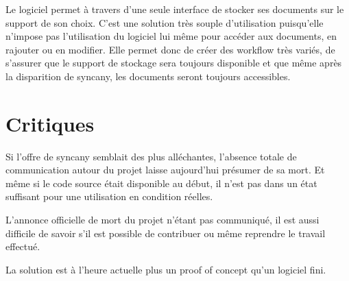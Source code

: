 Le logiciel permet à travers d'une seule interface de stocker ses documents sur le support de son choix. C'est une solution très souple d'utilisation puisqu'elle n'impose pas l'utilisation du logiciel lui même pour accéder aux documents, en rajouter ou en modifier. Elle permet donc de créer des workflow très variés, de s'assurer que le support de stockage sera toujours disponible et que même après la disparition de syncany, les documents seront toujours accessibles.

\section{Critiques}
Si l'offre de syncany semblait des plus alléchantes, l'absence totale de communication autour du projet laisse aujourd'hui présumer de sa mort. Et même si le code source était disponible au début, il n'est pas dans un état suffisant pour une utilisation en condition réelles.

L'annonce officielle de mort du projet n'étant pas communiqué, il est aussi difficile de savoir s'il est possible de contribuer ou même reprendre le travail effectué.

La solution est à l'heure actuelle plus un proof of concept qu'un logiciel fini.
